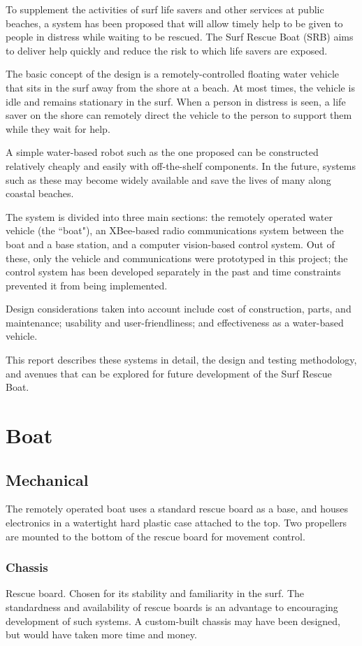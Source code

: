 \documentclass[a4paper]{IEEEtran}
\begin{document}
To supplement the activities of surf life savers and other services at public beaches, a system has been proposed that will allow timely help to be given to people in distress while waiting to be rescued. The Surf Rescue Boat (SRB) aims to deliver help quickly and reduce the risk to which life savers are exposed.

The basic concept of the design is a remotely-controlled floating water vehicle that sits in the surf away from the shore at a beach. At most times, the vehicle is idle and remains stationary in the surf. When a person in distress is seen, a life saver on the shore can remotely direct the vehicle to the person to support them while they wait for help.

A simple water-based robot such as the one proposed can be constructed relatively cheaply and easily with off-the-shelf components. In the future, systems such as these may become widely available and save the lives of many along coastal beaches.

The system is divided into three main sections: the remotely operated water vehicle (the ``boat"), an XBee-based radio communications system between the boat and a base station, and a computer vision-based control system. Out of these, only the vehicle and communications were prototyped in this project; the control system has been developed separately in the past and time constraints prevented it from being implemented.

Design considerations taken into account include cost of construction, parts, and maintenance; usability and user-friendliness; and effectiveness as a water-based vehicle.

This report describes these systems in detail, the design and testing methodology, and avenues that can be explored for future development of the Surf Rescue Boat.

\section{Boat}

\subsection{Mechanical}
The remotely operated boat uses a standard rescue board as a base, and houses electronics in a watertight hard plastic case attached to the top. Two propellers are mounted to the bottom of the rescue board for movement control.

\subsubsection{Chassis}
Rescue board. Chosen for its stability and familiarity in the surf. The standardness and availability of rescue boards is an advantage to encouraging development of such systems. A custom-built chassis may have been designed, but would have taken more time and money. 
\end{document}
